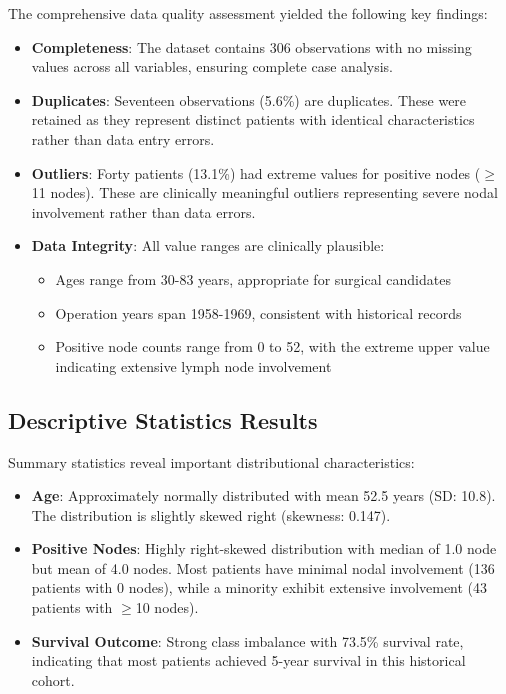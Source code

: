 \documentclass[12pt,a4paper]{article}
\begin{document}
The comprehensive data quality assessment yielded the following key findings:

\begin{itemize}
    \item \textbf{Completeness}: The dataset contains 306 observations with no missing values across all variables, ensuring complete case analysis.
    
    \item \textbf{Duplicates}: Seventeen observations (5.6\%) are duplicates. These were retained as they represent distinct patients with identical characteristics rather than data entry errors.
    
    \item \textbf{Outliers}: Forty patients (13.1\%) had extreme values for positive nodes ($\geq$11 nodes). These are clinically meaningful outliers representing severe nodal involvement rather than data errors.
    
    \item \textbf{Data Integrity}: All value ranges are clinically plausible:
    \begin{itemize}
        \item Ages range from 30-83 years, appropriate for surgical candidates
        \item Operation years span 1958-1969, consistent with historical records
        \item Positive node counts range from 0 to 52, with the extreme upper value indicating extensive lymph node involvement
    \end{itemize}
\end{itemize}

\subsection{Descriptive Statistics Results}

Summary statistics reveal important distributional characteristics:

\begin{itemize}
    \item \textbf{Age}: Approximately normally distributed with mean 52.5 years (SD: 10.8). The distribution is slightly skewed right (skewness: 0.147).
    
    \item \textbf{Positive Nodes}: Highly right-skewed distribution with median of 1.0 node but mean of 4.0 nodes. Most patients have minimal nodal involvement (136 patients with 0 nodes), while a minority exhibit extensive involvement (43 patients with $\geq$10 nodes).
    
    \item \textbf{Survival Outcome}: Strong class imbalance with 73.5\% survival rate, indicating that most patients achieved 5-year survival in this historical cohort.
\end{itemize}
\end{document}
